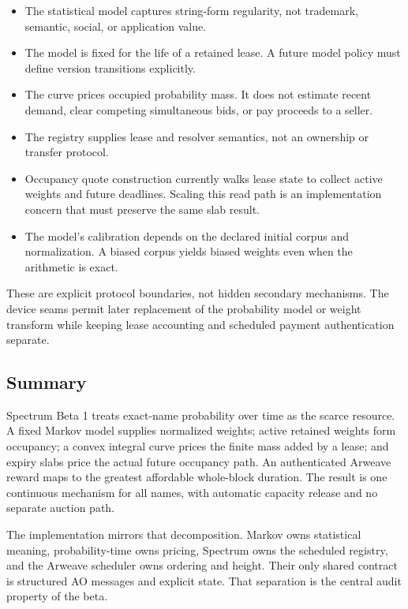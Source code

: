 \documentclass[10pt,twocolumn]{article}
\begin{document}
\begin{itemize}
  \item The statistical model captures string-form regularity, not trademark,
        semantic, social, or application value.
  \item The model is fixed for the life of a retained lease. A future model
        policy must define version transitions explicitly.
  \item The curve prices occupied probability mass. It does not estimate recent
        demand, clear competing simultaneous bids, or pay proceeds to a seller.
  \item The registry supplies lease and resolver semantics, not an ownership or
        transfer protocol.
  \item Occupancy quote construction currently walks lease state to collect
        active weights and future deadlines. Scaling this read path is an
        implementation concern that must preserve the same slab result.
  \item The model's calibration depends on the declared initial corpus and
        normalization. A biased corpus yields biased weights even when the
        arithmetic is exact.
\end{itemize}

These are explicit protocol boundaries, not hidden secondary mechanisms. The
device seams permit later replacement of the probability model or weight
transform while keeping lease accounting and scheduled payment authentication
separate.

\subsection{Summary}

Spectrum Beta 1 treats exact-name probability over time as the scarce resource.
A fixed Markov model supplies normalized weights; active retained weights form
occupancy; a convex integral curve prices the finite mass added by a lease; and
expiry slabs price the actual future occupancy path. An authenticated Arweave
reward maps to the greatest affordable whole-block duration. The result is one
continuous mechanism for all names, with automatic capacity release and no
separate auction path.

The implementation mirrors that decomposition. Markov owns statistical
meaning, probability-time owns pricing, Spectrum owns the scheduled registry,
and the Arweave scheduler owns ordering and height. Their only shared contract
is structured AO messages and explicit state. That separation is the central
audit property of the beta.
\end{document}
